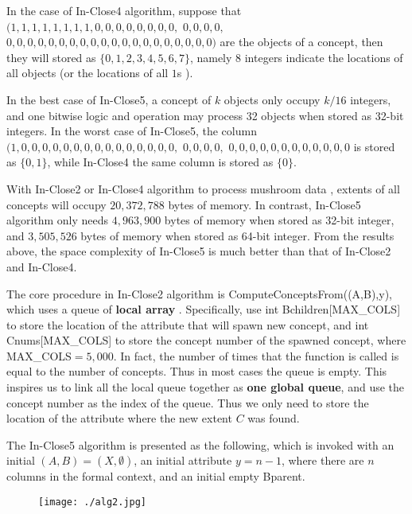 \documentclass[11pt]{article}
\numberwithin{equation}{subsection}
\begin{document}
In the case of In-Close4  algorithm, suppose that $(1,1,1,1,1,1,1,1,0,0,0,0,0,0,0,0,$ $0,0,0,0,$ $0,0,0,0,0,0,0,0,0,0,0,0,0,0,0,0,0,0,0,0)$ are the objects of a concept,
then they will stored as $\{0, 1, 2, 3, 4, 5, 6, 7\}$, namely $8$ integers indicate the locations of all objects (or the locations of all $1$s ). %

In the best case of In-Close5, a concept of $k$ objects only occupy  $k/16$ integers, and
one bitwise logic and operation may  process 32 objects when stored as 32-bit integers.
In the worst case of In-Close5, the column $(1,0,0,0, 0,0,0,0,0,0,0,0,0,0,0,0,$  $0,0,0,0,$ $0,0,0,0,  0,0,0,0,   0,0,0,0$ is stored as $\{0, 1\}$,
while In-Close4 the same column is stored as $\{0\}$.

With In-Close2  or In-Close4  algorithm to process mushroom data \cite{Frank}, extents of all concepts will occupy $20,372,788$ bytes of memory.
In contrast, In-Close5  algorithm only needs $4,963,900$ bytes of memory when stored as 32-bit integer,  and $3,505,526$ bytes of memory when stored as 64-bit integer.
From the results above, the space complexity of In-Close5 is much better than that of In-Close2 and In-Close4.


The core procedure in In-Close2 algorithm is ComputeConceptsFrom((A,B),y), which uses a queue of \textbf{local array} \cite{ Andrews11,Andrews}.
Specifically, use int Bchildren[MAX\_COLS] to store the location of the attribute  that will spawn new concept, and int Cnums[MAX\_COLS]
to store the concept number of the spawned concept, where MAX\_COLS$=5,000$.
In fact, the number of times that the function is called  is equal to the number of concepts. Thus in most cases the  queue is empty. This inspires us to link all the local queue together as \textbf{one global queue}, and use the concept number as the index of the queue.
Thus we only need to store the location of the attribute  where the new extent $C$   was found.


The In-Close5 algorithm is presented as the following, which is invoked   with an initial $(A,B)=(X,\emptyset)$, an initial attribute $y=n-1$, where there are $n$ columns in the formal context, and an initial empty Bparent.


    \begin{figure}[htp] \centering
        \texttt{[image: ./alg2.jpg]}
        \label{figInClose2}
    \end{figure}
\end{document}
